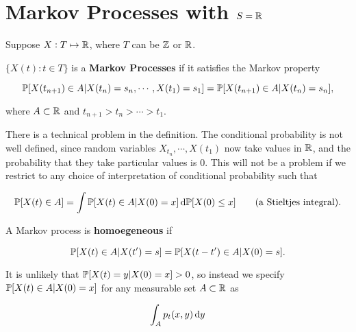 \section[Uncountable Markov Processes]{Markov Processes with $S = \mathbb{R}$}

Suppose $X: T \mapsto \mathbb{R}$, where $T$ can be $\mathbb{Z}$ or $\mathbb{R}$.

\begin{definition}
    $\{X(t): t \in T\}$ is a \textbf{Markov Processes} if it satisfies the Markov property

    \begin{equation*}
        \mathbb{P} [X(t_{n+1}) \in A | X(t_n) = s_n, \cdots, X(t_1) = s_1] = \mathbb{P} [X(t_{n+1}) \in A | X(t_n) = s_n],
    \end{equation*}

    where $A \subset \mathbb{R}$ and $t_{n+1} > t_n > \cdots > t_1$.
\end{definition}

\begin{remark}
    There is a technical problem in the definition. The conditional probability is not well defined, since random variables $X_{t_n}, \cdots, X(t_1)$ now take values in $\mathbb{R}$, and the probability that they take particular values is $0$. This will not be a problem if we restrict to any choice of interpretation of conditional probability such that 

    \begin{equation*}
        \Prob[X(t) \in A] = \int \Prob[X(t) \in A | X(0) = x] \dif \Prob [X(0) \le x] \qquad \text{(a Stieltjes integral)}.
    \end{equation*}
\end{remark}

\begin{definition}[Homogeneity]
    A Markov process is \textbf{homoegeneous} if 

    \begin{equation*}
        \mathbb{P} [X(t) \in A | X(t') = s] = \mathbb{P} [X(t-t') \in A | X(0) = s].
    \end{equation*}
\end{definition}

It is unlikely that $\mathbb{P} [X(t) = y | X(0) = x] > 0$, so instead we specify $\mathbb{P} [X(t) \in A | X(0) = x]$ for any measurable set $A \subset \mathbb{R}$ as 

\begin{equation*}
    \int_A p_t(x,y) \dif y
\end{equation*}

